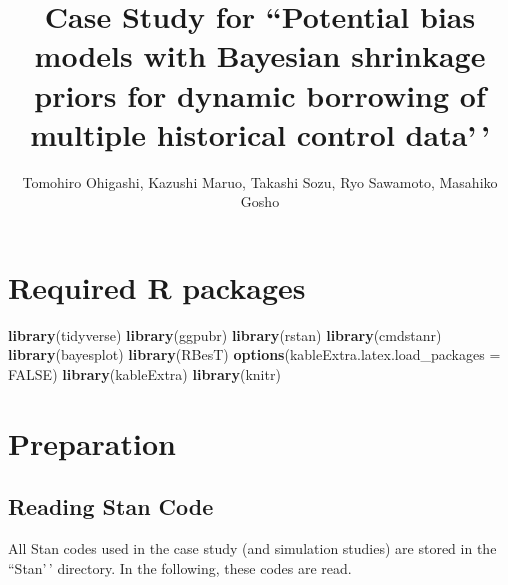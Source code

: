 \documentclass[
]{article}
\title{Case Study for ``Potential bias models with Bayesian shrinkage
priors for dynamic borrowing of multiple historical control data'\,'}
\author{Tomohiro Ohigashi, Kazushi Maruo, Takashi Sozu, Ryo Sawamoto,
Masahiko Gosho}
\date{}
\newenvironment{Shaded}{\begin{snugshade}}{\end{snugshade}}
\newcommand{\AttributeTok}[1]{\textcolor[rgb]{0.13,0.29,0.53}{#1}}
\newcommand{\ConstantTok}[1]{\textcolor[rgb]{0.56,0.35,0.01}{#1}}
\newcommand{\FunctionTok}[1]{\textcolor[rgb]{0.13,0.29,0.53}{\textbf{#1}}}
\newcommand{\NormalTok}[1]{#1}
\begin{document}
\maketitle

{
\setcounter{tocdepth}{2}
\tableofcontents
}
\hypertarget{required-r-packages}{%
\section{Required R packages}\label{required-r-packages}}

\begin{Shaded}
\begin{Highlighting}[]
\FunctionTok{library}\NormalTok{(tidyverse)}
\FunctionTok{library}\NormalTok{(ggpubr)}
\FunctionTok{library}\NormalTok{(rstan)}
\FunctionTok{library}\NormalTok{(cmdstanr)}
\FunctionTok{library}\NormalTok{(bayesplot)}
\FunctionTok{library}\NormalTok{(RBesT)}
\FunctionTok{options}\NormalTok{(}\AttributeTok{kableExtra.latex.load\_packages =} \ConstantTok{FALSE}\NormalTok{)}
\FunctionTok{library}\NormalTok{(kableExtra)}
\FunctionTok{library}\NormalTok{(knitr)}
\end{Highlighting}
\end{Shaded}

\hypertarget{preparation}{%
\section{Preparation}\label{preparation}}

\hypertarget{reading-stan-code}{%
\subsection{Reading Stan Code}\label{reading-stan-code}}

All Stan codes used in the case study (and simulation studies) are
stored in the ``Stan'\,' directory. In the following, these codes are
read.
\end{document}
